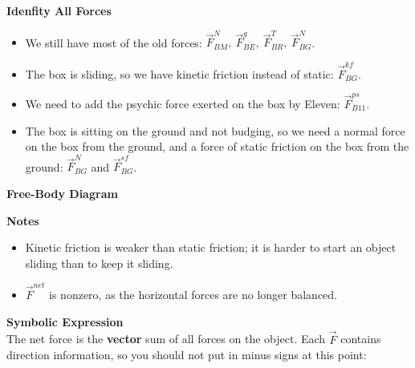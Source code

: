 \documentclass[]{article}
\begin{document}
\newpage
\begin{TeacherMargin}
\noindent\textbf{Idenfity All Forces}
\begin{itemize}
	\item We still have most of the old forces: $\vec{F}^{N}_{BM},\ \vec{F}^{g}_{BE},\ \vec{F}^{T}_{BR},\ \vec{F}^{N}_{BG}$.
	\item The box is sliding, so we have kinetic friction instead of static: $\vec{F}^{kf}_{BG}$.
	\item We need to add the psychic force exerted on the box by Eleven: $\vec{F}^{ps}_{B11}$.
	\item The box is sitting on the ground and not budging, so we need a normal force on the box from the ground, and a force of static friction on the box from the ground: $\vec{F}^{N}_{BG}$ and $\vec{F}^{sf}_{BG}$.
\end{itemize}
\noindent\textbf{Free-Body Diagram}
\vspace{-0.75cm}
\begin{center}
\end{center}
\vspace{-0.75cm}
\textbf{Notes}
\begin{itemize}
	\item Kinetic friction is weaker than static friction; it is harder to start an object sliding than to keep it sliding.
	\item $\vec{F}^{net}$ is nonzero, as the horizontal forces are no longer balanced.
\end{itemize}
\textbf{Symbolic Expression} \\
The net force is the \textbf{vector} sum of all forces on the object. Each $\vec{F}$ contains direction information, so you should not put in minus signs at this point:

\end{TeacherMargin}
\end{document}
